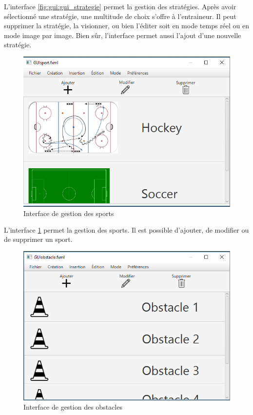 L'interface \ref{fig:gui:gui_strategie} permet la gestion des stratégies.
Après avoir sélectionné une stratégie, une multitude de choix s'offre à l'entraineur.
Il peut supprimer la stratégie, la visionner, ou bien l'éditer soit en mode temps réel ou en mode image par image.
Bien sûr, l'interface permet aussi l'ajout d'une nouvelle stratégie.
\newpage

\begin{figure}[htpb]
    \centering
    \includegraphics[scale=0.6]{fig/gui/gui_sport.png}
    \caption{Interface de gestion des sports}
    \label{fig:gui:gui_sport}
\end{figure}

L'interface \ref{fig:gui:gui_sport} permet la gestion des sports.
Il est possible d'ajouter, de modifier ou de supprimer un sport.

\begin{figure}[htpb]
    \centering
    \includegraphics[scale=0.6]{fig/gui/gui_obstacles.png}
    \caption{Interface de gestion des obstacles}
    \label{fig:gui:gui_obstacles}
\end{figure}

